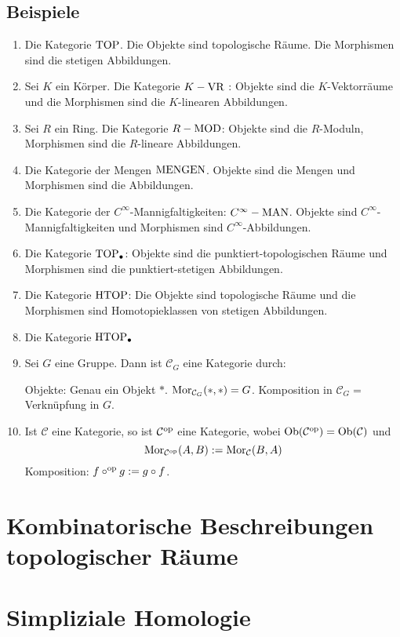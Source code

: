 \subsection[Beispiele für Kategorien]{Beispiele} %
\label{sub:12}
\begin{enumerate}[(1)]
	\item Die Kategorie $\operatorname{TOP}$. Die Objekte sind topologische Räume. Die Morphismen sind die stetigen Abbildungen.
	\item Sei $K$ ein Körper. Die Kategorie $K-\operatorname{VR}$ : Objekte sind die $K$-Vektorräume und die Morphismen sind die $K$-linearen Abbildungen. 
	\item Sei $R$ ein Ring. Die Kategorie $R-\operatorname{MOD}$: Objekte sind die $R$-Moduln, Morphismen sind die $R$-lineare Abbildungen.
	\item Die Kategorie der Mengen $\operatorname{MENGEN}$. Objekte sind die Mengen und Morphismen sind die Abbildungen.
	\item Die Kategorie der $C^\infty$-Mannigfaltigkeiten: $C^\infty-\operatorname{MAN}$. Objekte sind $C^\infty$-Mannigfaltigkeiten und Morphismen sind $C^\infty$-Abbildungen.
	\item Die Kategorie $\operatorname{TOP}_\bullet$: Objekte sind die punktiert-topologischen Räume und Morphismen sind die punktiert-stetigen Abbildungen.
	\item Die Kategorie $\operatorname{HTOP}$: Die Objekte sind topologische Räume und die Morphismen sind Homotopieklassen von stetigen Abbildungen.
	\item Die Kategorie $\operatorname{HTOP}_\bullet$
	\item Sei $G$ eine Gruppe. Dann ist $\mathcal{C}_G$ eine Kategorie durch:
	
	Objekte: Genau ein Objekt $*$. $\operatorname{Mor}_{\mathcal{C}_G}(*,*) = G$. Komposition in $\mathcal{C}_G =$ Verknüpfung in $G$.
	\item Ist $\mathcal{C}$ eine Kategorie, so ist $\mathcal{C}^{\mathrm{op}}$ eine Kategorie, wobei $\operatorname{Ob}(\mathcal{C}^{\mathrm{op}}) = \operatorname{Ob}(\mathcal{C})$ und 
	\[
		\operatorname{Mor}_{\mathcal{C}^{\mathrm{op}}}(A,B) := \operatorname{Mor}_\mathcal{C}(B,A)
	\]
	Komposition: $f \circ^{\mathrm{op}} g := g \circ f$.
\end{enumerate}
\newpage

\section{Kombinatorische Beschreibungen topologischer Räume} %
\label{sec:2}

\newpage

\section{Simpliziale Homologie} %
\label{sec:3}




\cleardoubleoddemptypage
{}
\setcounter{page}{1}
\printindex
\listoffigures

